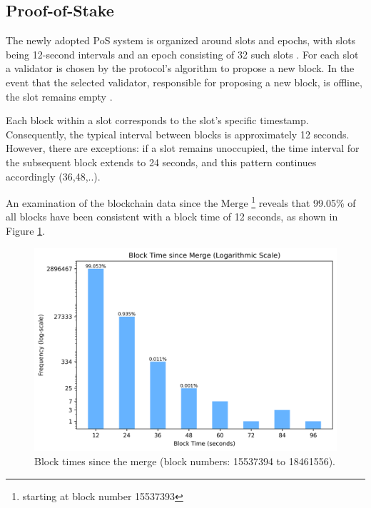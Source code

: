 \subsection{Proof-of-Stake}
\label{pos_block_time}

The newly adopted PoS system is organized around slots and epochs, with slots
being 12-second
intervals and an epoch consisting of 32 such slots
\cite{seconds-per-slot-mainnet}\cite{seconds-per-slot-mainnet-doc}. For each
slot a validator is chosen by the protocol's algorithm to propose a new block.
In the event that the selected validator, responsible for proposing a new
block, is offline, the slot remains empty
\cite{validator-offline}.

Each block within a slot corresponds to the slot's specific timestamp.
Consequently, the typical interval between blocks is approximately 12 seconds.
However, there are exceptions: if a slot remains unoccupied, the time interval
for the subsequent block extends to 24 seconds, and this pattern continues
accordingly (36,48,..).

An examination of the blockchain data since the Merge \footnote{starting at block number
15537393} reveals that 99.05\% of all blocks have been consistent with a block
time of 12 seconds, as shown in Figure
\ref{fig:block_time_analysis}.

\begin{figure}[H]
  \centering
  \includegraphics[width=1\textwidth]{block_time_analysis/pos_block_time_bar_chart_with_percentages.png}
  \caption{Block times since the merge (block numbers: 15537394 to 18461556).}
  \label{fig:block_time_analysis}
\end{figure}

